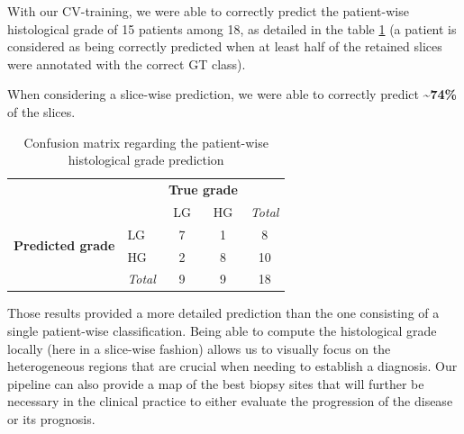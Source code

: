 \documentclass[]{article}
\renewcommand{\arraystretch}{5}
\begin{document}
With our CV-training, we were able to correctly predict the patient-wise
histological grade of 15 patients among 18, as detailed in the table \ref{tab:confusion_matrix} (a patient is considered as being correctly predicted
when at least half of the retained slices were annotated with the
correct GT class).

When considering a slice-wise prediction, we were able to correctly
predict \textbf{\textasciitilde{}74\%} of the slices.


\renewcommand{\arraystretch}{2}
\begin{table}[!htp]\centering
\caption{Confusion matrix regarding the patient-wise  histological grade prediction}\label{tab:confusion_matrix}
\begin{tabular}{l|l|c|c|c}
\multicolumn{2}{c}{}&\multicolumn{2}{c}{\textbf{True grade}}&\\
\cline{3-4}
\multicolumn{2}{c|}{}&LG&HG&\multicolumn{1}{c}{\textit{Total}}\\
\cline{2-4}
\multirow{2}{*}{\textbf{Predicted grade}}& LG & 7 & 1 & 8\\
\cline{2-4}
& HG & 2 & 8 & 10 \\
\cline{2-4}
\multicolumn{1}{c}{} & \multicolumn{1}{c}{\textit{Total}} & \multicolumn{1}{c}{9} & \multicolumn{    1}{c}{9} & \multicolumn{1}{c}{18}\\
\end{tabular}
\end{table}
\renewcommand{\arraystretch}{5}


Those results provided a more detailed prediction than the one
consisting of a single patient-wise classification. Being able to
compute the histological grade locally (here in a slice-wise fashion)
allows us to visually focus on the heterogeneous regions that are
crucial when needing to establish a diagnosis. Our pipeline can also
provide a map of the best biopsy sites that will further be necessary in
the clinical practice to either evaluate the progression of the disease
or its prognosis.


\newpage


\end{document}
